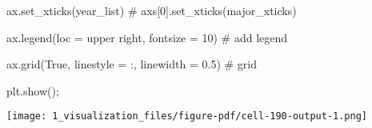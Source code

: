 \documentclass[
  letterpaper,
  DIV=11,
  numbers=noendperiod]{scrartcl}
\newenvironment{Shaded}{\begin{snugshade}}{\end{snugshade}}
\newcommand{\CommentTok}[1]{\textcolor[rgb]{0.37,0.37,0.37}{#1}}
\newcommand{\DecValTok}[1]{\textcolor[rgb]{0.68,0.00,0.00}{#1}}
\newcommand{\FloatTok}[1]{\textcolor[rgb]{0.68,0.00,0.00}{#1}}
\newcommand{\NormalTok}[1]{\textcolor[rgb]{0.00,0.23,0.31}{#1}}
\newcommand{\OperatorTok}[1]{\textcolor[rgb]{0.37,0.37,0.37}{#1}}
\newcommand{\StringTok}[1]{\textcolor[rgb]{0.13,0.47,0.30}{#1}}
\newcommand{\VariableTok}[1]{\textcolor[rgb]{0.07,0.07,0.07}{#1}}
\begin{document}
\begin{Shaded}
\begin{Highlighting}[]
\NormalTok{ax.set\_xticks(year\_list)}
\CommentTok{\# axs[0].set\_xticks(major\_xticks)}

\NormalTok{ax.legend(loc }\OperatorTok{=} \StringTok{\textquotesingle{}upper right\textquotesingle{}}\NormalTok{, fontsize }\OperatorTok{=} \DecValTok{10}\NormalTok{) }\CommentTok{\# add legend}

\NormalTok{ax.grid(}\VariableTok{True}\NormalTok{, linestyle }\OperatorTok{=} \StringTok{\textquotesingle{}:\textquotesingle{}}\NormalTok{, linewidth }\OperatorTok{=} \FloatTok{0.5}\NormalTok{) }\CommentTok{\# grid}

\NormalTok{plt.show()}\OperatorTok{;}
\end{Highlighting}
\end{Shaded}

\texttt{[image: 1\_visualization\_files/figure-pdf/cell-190-output-1.png]}
\end{document}
